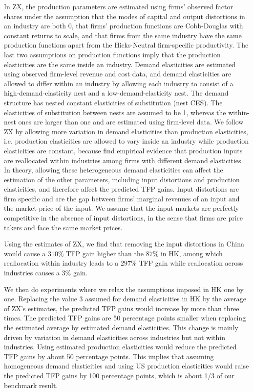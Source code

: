 \documentclass[12pt]{article}
\begin{document}
In ZX, the production parameters are estimated using firms' observed factor shares under the assumption that the modes of capital and output distortions in an industry are both 0, that firms' production functions are Cobb-Douglas with constant returns to scale, and that firms from the same industry have the same production functions apart from the Hicks-Neutral firm-specific productivity. The last two assumptions on production functions imply that the production elasticities are the same inside an industry. Demand elasticities are estimated using observed firm-level revenue and cost data, and demand elasticities are allowed to differ within an industry by allowing each industry to consist of a high-demand-elasticity nest and a low-demand-elasticity nest. The demand structure has nested constant elasticities of substitution (nest CES). The elasticities of substitution between nests are assumed to be 1, whereas the within-nest ones are larger than one and are estimated using firm-level data. We follow ZX by allowing more variation in demand elasticities than production elasticities, i.e. production elasticities are allowed to vary inside an industry while production elasticities are constant, because \citet{autorFallLaborShare2020} find empirical evidence that production inputs are reallocated within industries among firms with different demand elasticities. In theory, allowing these heterogeneous demand elasticities can affect the estimation of the other parameters, including input distortions and production elasticities, and therefore affect the predicted TFP gains. Input distortions are firm specific and are the gap between firms' marginal revenues of an input and the market price of the input. We assume that the input markets are perfectly competitive in the absence of input distortions, in the sense that firms are price takers and face the same market prices. 

Using the estimates of ZX, we find that removing the input distortions in China would cause a $310\%$ TFP gain higher than the $87\%$ in HK, among which reallocation within industry leads to a $297\%$ TFP gain while reallocation across industries causes a $3\%$ gain. 

We then do experiments where we relax the assumptions imposed in HK one by one. Replacing the value 3 assumed for demand elasticities in HK by the average of ZX's estimates, the predicted TFP gains would increase by more than three times. The predicted TFP gains are 50 percentage points smaller when replacing the estimated average by estimated demand elasticities. This change is mainly driven by variation in demand elasticities across industries but not within industries. Using estimated production elasticities would reduce the predicted TFP gains by about 50 percentage points. This implies that assuming homogeneous demand elasticities and using US production elasticities would raise the predicted TFP gains by 100 percentage points, which is about 1/3 of our benchmark result. \label{par:ch3KeyResults}
\end{document}

